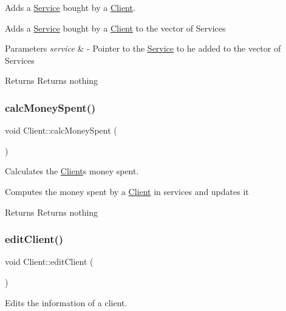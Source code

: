 Adds a \hyperlink{class_service}{Service} bought by a \hyperlink{class_client}{Client}. 

Adds a \hyperlink{class_service}{Service} bought by a \hyperlink{class_client}{Client} to the vector of Services


\begin{DoxyParams}{Parameters}
{\em service} & -\/ Pointer to the \hyperlink{class_service}{Service} to he added to the vector of Services \\
\hline
\end{DoxyParams}
\begin{DoxyReturn}{Returns}
Returns nothing 
\end{DoxyReturn}
\mbox{\label{class_client_a65027bc2da365dfdbbf0393ee2697586}} 
\subsubsection{\texorpdfstring{calc\+Money\+Spent()}{calcMoneySpent()}}
{\footnotesize\ttfamily void Client\+::calc\+Money\+Spent (\begin{DoxyParamCaption}{ }\end{DoxyParamCaption})}



Calculates the \hyperlink{class_client}{Client}\textquotesingle{}s money spent. 

Computes the money spent by a \hyperlink{class_client}{Client} in services and updates it

\begin{DoxyReturn}{Returns}
Returns nothing 
\end{DoxyReturn}
\mbox{\label{class_client_afe8b004559fd1480fb8747c352f167db}} 
\subsubsection{\texorpdfstring{edit\+Client()}{editClient()}}
{\footnotesize\ttfamily void Client\+::edit\+Client (\begin{DoxyParamCaption}{ }\end{DoxyParamCaption})}



Edits the information of a client. 

